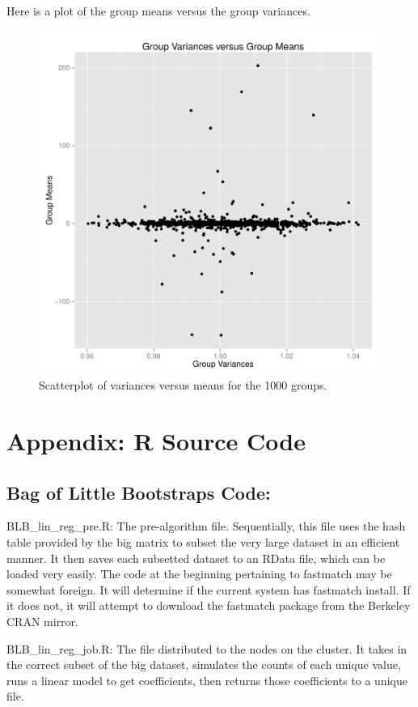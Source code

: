 \documentclass[12pt]{article}
\begin{document}
Here is a plot of the group means versus the group variances.
\begin{figure}[H] \center
\includegraphics[scale=.75]{Hive/mean_by_var.pdf}
\caption*{Scatterplot of variances versus means for the 1000 groups.}
\end{figure}

\section*{Appendix: R Source Code}
\subsection*{Bag of Little Bootstraps Code:}
BLB\_lin\_reg\_pre.R:
The pre-algorithm file. Sequentially, this file uses the hash table provided by the big matrix to subset the very large dataset in an efficient manner. It then saves each subsetted dataset to an RData file, which can be loaded very easily. The code at the beginning pertaining to fastmatch may be somewhat foreign. It will determine if the current system has fastmatch install. If it does not, it will attempt to download the fastmatch package from the Berkeley CRAN mirror.


BLB\_lin\_reg\_job.R:
The file distributed to the nodes on the cluster. It takes in the correct subset of the big dataset, simulates the counts of each unique value, runs a linear model to get coefficients, then returns those coefficients to a unique file.

\end{document}
